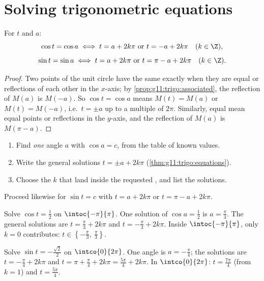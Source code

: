 \section{Solving trigonometric equations}

\begin{theorem}[The equations $\cos t = \cos a$ and $\sin t = \sin a$]
\label{thm:g11:trigo:equations}
For  $t$ and $a$:
\[
\cos t = \cos a \iff t = a + 2k\pi \ \text{or}\ t = -a + 2k\pi
\quad (k \in \Z),
\]
\[
\sin t = \sin a \iff t = a + 2k\pi \ \text{or}\ t = \pi - a + 2k\pi
\quad (k \in \Z).
\]
\end{theorem}

\begin{proof}
Two points of the unit circle have the same  exactly when they are
equal or reflections of each other in the $x$-axis; by
\cref{prop:g11:trigo:associated}, the reflection of $M(a)$ is $M(-a)$. So
$\cos t = \cos a$ means $M(t) = M(a)$ or $M(t) = M(-a)$, i.e.\
$t = \pm a$ up to a multiple of $2\pi$. Similarly, equal  mean
equal points or reflections in the $y$-axis, and the reflection of $M(a)$
is $M(\pi - a)$.
\end{proof}

\begin{method}[Solving $\cos t = c$ on an interval]\label{met:g11:trigo:solve}
\begin{enumerate}
  \item Find \emph{one} angle $a$ with $\cos a = c$, from the table of
        known values.
  \item Write the general solutions $t = \pm a + 2k\pi$
        (\cref{thm:g11:trigo:equations}).
  \item Choose the  $k$ that land inside the requested ,
        and list the solutions.
\end{enumerate}
Proceed likewise for $\sin t = c$ with $t = a + 2k\pi$ or
$t = \pi - a + 2k\pi$.
\end{method}

\begin{example}\label{ex:g11:trigo:solve}
Solve $\cos t = \frac12$ on $\intoc{-\pi}{\pi}$. One solution of
$\cos a = \frac12$ is $a = \frac{\pi}{3}$. The general solutions are
$t = \frac\pi3 + 2k\pi$ and $t = -\frac\pi3 + 2k\pi$. Inside
$\intoc{-\pi}{\pi}$, only $k = 0$ contributes:
$t \in \left\{-\frac\pi3,\ \frac\pi3\right\}$.

Solve $\sin t = -\frac{\sqrt2}{2}$ on $\intco{0}{2\pi}$. One angle is
$a = -\frac\pi4$; the solutions are $t = -\frac\pi4 + 2k\pi$ and
$t = \pi + \frac\pi4 + 2k\pi = \frac{5\pi}{4} + 2k\pi$. In
$\intco{0}{2\pi}$: $t = \frac{7\pi}{4}$ (from $k = 1$) and
$t = \frac{5\pi}{4}$.
\end{example}


